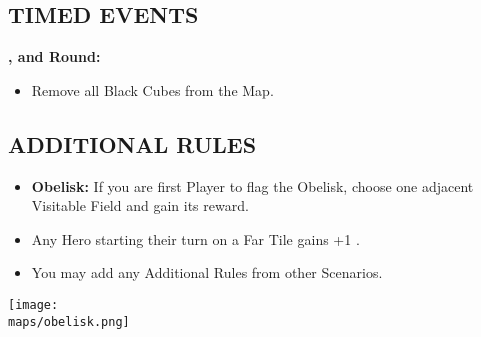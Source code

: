 \begin{multicols*}{2}
\subsection*{\MakeUppercase{Timed Events}}
\textbf{,  and  Round:}
\begin{itemize}
  \item Remove all Black Cubes from the Map.
\end{itemize}

\subsection*{\MakeUppercase{Additional Rules}}
\begin{itemize}
  \item \textbf{Obelisk:} If you are first Player to flag the Obelisk, choose one adjacent Visitable Field and gain its reward.
  \item Any Hero starting their turn on a Far Tile gains +1 .
  \item You may add any Additional Rules from other Scenarios.
\end{itemize}

\begin{center}
  \vfill
  \texttt{[image: \\maps/obelisk.png]}
  \vfill
\end{center}

\end{multicols*}

